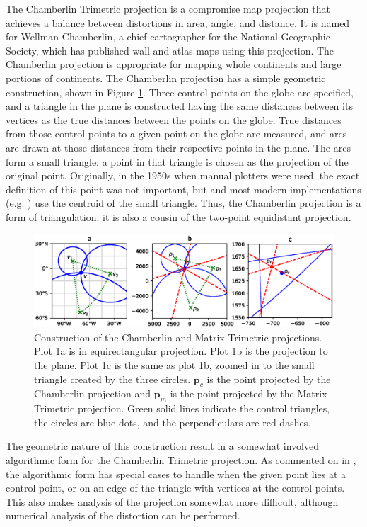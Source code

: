 \documentclass[]{interact}
\begin{document}
The Chamberlin Trimetric projection is a compromise map projection that achieves
a balance between distortions in area, angle, and distance. It is named for
Wellman Chamberlin, a chief cartographer for the National Geographic
Society, which has published wall and atlas maps using this projection. The
Chamberlin projection is appropriate for mapping whole continents and large
portions of continents. The Chamberlin projection has a simple geometric
construction, shown in Figure \ref{fig:chamberlin}. Three control points on the
globe are specified, and a triangle in the plane is constructed having the same
distances between its vertices as the true distances between the points on the
globe. True distances from those control points to a given point on the globe
are measured, and arcs are drawn at those distances from their respective points
in the plane. The arcs form a small triangle: a point in that triangle is chosen
as the projection of the original point.\citep{christensen} Originally, in the
1950s when manual plotters were used, the exact definition of this point was not
important, but \citet{christensen} and most modern implementations
(e.g. \citet{proj}) use the centroid of the small triangle.
Thus, the Chamberlin projection is a form of triangulation:
it is also a cousin of the two-point equidistant projection.\citep{snyder89}

\begin{figure}%
  \includegraphics[width=\textwidth]{construction}
  \caption{Construction of the Chamberlin and Matrix Trimetric projections.
  Plot 1a is in equirectangular projection. Plot 1b is the projection
  to the plane. Plot 1c is the same as plot 1b, zoomed in to the small
  triangle created by the three circles. $\mathbf p_c$ is the point projected
  by the Chamberlin projection and $\mathbf p_m$ is the point projected
  by the Matrix Trimetric projection. Green solid lines indicate the control
  triangles, the circles are blue dots, and the perpendiculars are red dashes.}
  \label{fig:chamberlin}
\end{figure}

The geometric nature of this construction result in a somewhat involved
algorithmic form for the Chamberlin Trimetric projection. As commented on in
\citet{christensen}, the algorithmic form has special cases to handle when the
given point lies at a control point, or on an edge of the triangle with vertices
at the control points. This also makes analysis of the projection somewhat more
difficult, although numerical analysis of the distortion can be performed.
\end{document}
